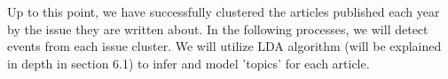  Up to this point, we have successfully clustered the articles published each year by the issue they are written about. In the following processes, we will detect events from each issue cluster. We will utilize LDA algorithm (will be explained in depth in section 6.1) to infer and model 'topics' for each article.